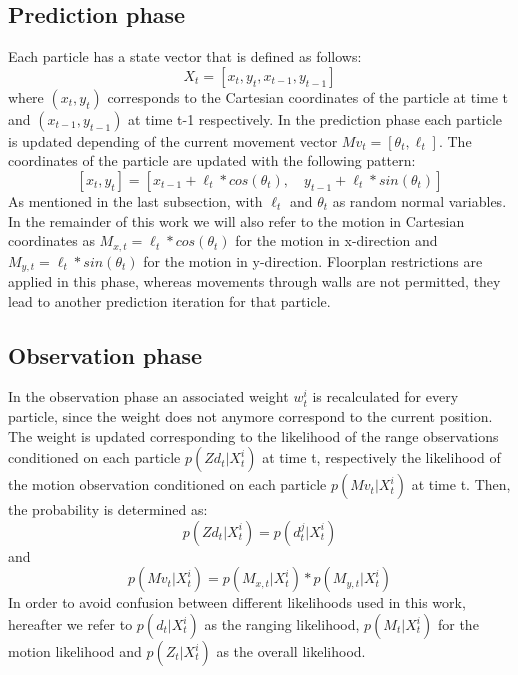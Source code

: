 \subsection{Prediction phase}
Each particle has a state vector that is defined as follows:
$$X_{t} = [x_{t}, y_{t}, x_{t-1}, y_{t-1}]$$
where $(x_{t}, y_{t})$ corresponds to the Cartesian coordinates of the particle at time t and $(x_{t-1}, y_{t-1})$ at time t-1 respectively. In the prediction phase each particle is updated depending of the current movement vector $Mv_{t} = [\theta_{t}, \ell_{t}]$. The coordinates of the particle are updated with the following pattern:
$$[x_{t}, y_{t}]  = [x_{t-1} + \ell_{t} * cos(\theta_{t}),\quad y_{t-1} + \ell_{t} * sin(\theta_{t})]$$
As mentioned in the last subsection, with $\ell_{t}$ and $\theta_{t}$ as random normal variables. In the remainder of this work we will also refer to the motion in Cartesian coordinates as $M_{x,t} = \ell_{t} * cos(\theta_{t})$ for the motion in x-direction and $M_{y,t} = \ell_{t} * sin(\theta_{t})$ for the motion in y-direction.
Floorplan restrictions are applied in this phase, whereas movements through walls are not permitted, they lead to another prediction iteration for that particle.

\subsection{Observation phase}
In the observation phase an associated weight $w^{i}_{t}$ is recalculated for every particle, since the weight does not anymore correspond to the current position. The weight is updated corresponding to the likelihood of the range observations conditioned on each particle $p(Zd_{t} | X^{i}_{t})$ at time t, respectively the likelihood of the motion observation conditioned on each particle $p(Mv_{t} | X^{i}_{t})$ at time t. Then, the probability is determined as:
$$ p(Zd_{t} | X^{i}_{t}) = p(d_{t}^{j} | X^{i}_{t}) $$
and $$ p(Mv_{t} | X^{i}_{t}) = p(M_{x,t} | X^{i}_{t}) * p(M_{y,t} | X^{i}_{t})$$ %
In order to avoid confusion between different likelihoods used in this work, hereafter we refer to $p(d_{t} | X^{i}_{t})$ as the ranging likelihood, $p(M_{t} | X^{i}_{t})$ for the motion likelihood and $p(Z_{t} | X^{i}_{t})$ as the overall likelihood.

